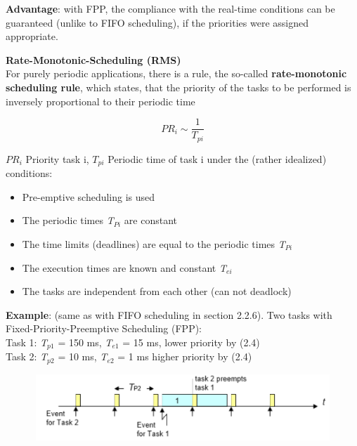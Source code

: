 \textbf{Advantage}: with FPP, the compliance with the real-time conditions can be guaranteed (unlike to FIFO scheduling), if the priorities were assigned appropriate. \\


{\rot\bf Rate-Monotonic-Scheduling (RMS)}\\

For purely periodic applications, there is a rule, the so-called \textbf{rate-monotonic scheduling rule}, which states, that the priority of the tasks to be performed is inversely proportional to their periodic time

\begin{equation}
	PR_{i} \sim \frac{1}{T_{pi} } 
\label{EQ }
\end{equation}

$PR_i$ Priority task i, $T_{pi}$ Periodic time of task i under the (rather idealized) conditions:

\begin{itemize}
	\item  Pre-emptive scheduling is used
	\item  The periodic times \textit{T${}_{Pi}$} are constant 		
	\item  The time limits (deadlines) are equal to the periodic times \textit{T${}_{Pi}$}
	\item  The execution times are known and constant \textit{T${}_{ei}$}
	\item  The tasks are independent from each other (can not deadlock)
\end{itemize}

\textbf{Example}: (same as with FIFO scheduling in section 2.2.6). Two tasks with Fixed-Priority-Preemptive Scheduling (FPP):\\

Task 1: \textit{T}${}_{p1}$ = 150 ms, \textit{T}${}_{e1}$ = 15 ms,   lower priority by   (2.4)\\
Task 2: \textit{T}${}_{p2}$ = 10 ms,  \textit{T}${}_{e2}$ = 1 ms   higher priority by (2.4)\\

 	\begin{figure}[h]
    \centering
    \includegraphics[width=12cm, height=2.5cm]{Images/image99.png}
    \label{fig:Fig 44}
    \end{figure}

